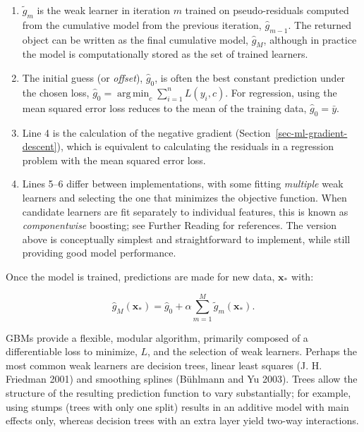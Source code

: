 \documentclass[
  letterpaper,
  krantz2]{style/krantz}
\providecommand{\tightlist}{%
  \setlength{\itemsep}{0pt}\setlength{\parskip}{0pt}}
\begin{document}
\begin{tcolorbox}
\begin{enumerate}
\def\labelenumi{\arabic{enumi}.}
\tightlist
\item
  \(\tilde{g}_m\) is the weak learner in iteration \(m\) trained on
  pseudo-residuals computed from the cumulative
  model from the previous iteration, \(\hat{g}_{m-1}\). The returned
  object can be written as the final cumulative model, \(\hat{g}_M\),
  although in practice the model is computationally stored as the set of
  trained learners.
\item
  The initial guess (or \emph{offset}), \(\hat{g}_0\), is often the best
  constant prediction under the chosen loss,
  \(\hat{g}_0 = \mathop{\mathrm{arg\,min}}_c \sum_{i=1}^n L(y_i, c)\).
  For regression, using the mean squared error loss reduces to the mean
  of the training data, \(\hat{g}_0 = \bar{y}\).
\item
  Line 4 is the calculation of the negative gradient
  (Section~\ref{sec-ml-gradient-descent}), which is equivalent to
  calculating the residuals in a regression problem with the mean
  squared error loss.
\item
  Lines 5--6 differ between implementations, with some fitting
  \emph{multiple} weak learners and selecting the one that minimizes the
  objective function. When candidate learners are fit separately to
  individual features, this is known as \emph{componentwise} boosting;
  see Further Reading for references. The version above is conceptually
  simplest and straightforward to implement, while still providing good
  model performance.
\end{enumerate}

\end{tcolorbox}

Once the model is trained, predictions are made for new data,
\(\mathbf{x}_*\) with:

\[
\hat{g}_M(\mathbf{x}_*) = \hat{g}_0 + \alpha \sum^M_{m=1} \tilde{g}_m(\mathbf{x}_*).
\]

GBMs provide a flexible, modular algorithm, primarily composed of a
differentiable loss to minimize, \(L\), and the selection of weak
learners. Perhaps the most common weak learners are decision trees,
linear least squares (J. H. Friedman 2001) and smoothing splines
(Bühlmann and Yu 2003).
Trees allow the structure of the resulting prediction function to vary
substantially; for example, using stumps (trees with only one split)
results in an additive model with main effects only, whereas decision
trees with an extra layer yield two-way interactions.
\end{document}
